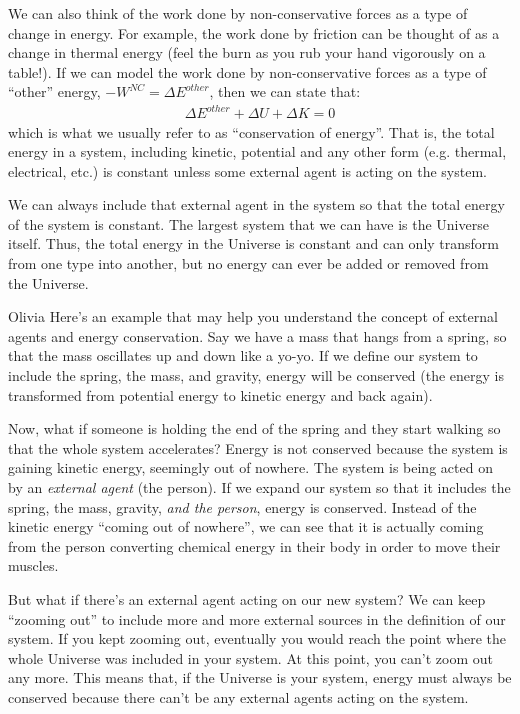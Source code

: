 We can also think of the work done by non-conservative forces as a type of change in energy. For example, the work done by friction can be thought of as a change in thermal energy (feel the burn as you rub your hand vigorously on a table!). If we can model the work done by non-conservative forces as a type of ``other'' energy, $-W^{NC}=\Delta E^{other}$, then we can state that:
\begin{align*}
\Delta E^{other} + \Delta U + \Delta K =0
\end{align*}
which is what we usually refer to as ``conservation of energy''. That is, the total energy in a system, including kinetic, potential and any other form (e.g. thermal, electrical, etc.) is constant unless some external agent is acting on the system. 

We can always include that external agent in the system so that the total energy of the system is constant. The largest system that we can have is the Universe itself. Thus, the total energy in the Universe is constant and can only transform from one type into another, but no energy can ever be added or removed from the Universe.
\vspace{-0.25cm}
\begin{studentOpinion}{Olivia}
Here's an example that may help you understand the concept of external agents and energy conservation. Say we have a mass that hangs from a spring, so that the mass oscillates up and down like a yo-yo. If we define our system to include the spring, the mass, and gravity, energy will be conserved (the energy is transformed from potential energy to kinetic energy and back again). 

Now, what if someone is holding the end of the spring and they start walking so that the whole system accelerates? Energy is not conserved because the system is gaining kinetic energy, seemingly out of nowhere. The system is being acted on by an \textit{external agent} (the person). If we expand our system so that it includes the spring, the mass, gravity, \textit{and the person}, energy is conserved. Instead of the kinetic energy ``coming out of nowhere'', we can see that it is actually coming from the person converting chemical energy in their body in order to move their muscles.

But what if there's an external agent acting on our new system? We can keep ``zooming out'' to include more and more external sources in the definition of our system. If you kept zooming out, eventually you would reach the point where the whole Universe was included in your system. At this point, you can't zoom out any more. This means that, if the Universe is your system, energy must always be conserved because there can't be any external agents acting on the system. 
\end{studentOpinion}
